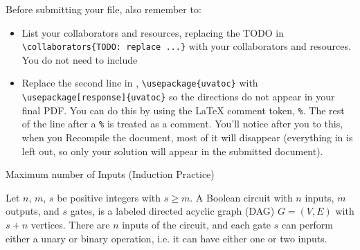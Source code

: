 \documentclass[11pt]{article}
\begin{document}
{Before submitting your  file, also remember to:
\begin{itemize}
\item List your collaborators and resources, replacing the TODO in {\texttt{\textbackslash collaborators\{TODO: replace ...\}}} with your collaborators and resources. You do not need to include

\item Replace the second line in , \texttt{\textbackslash usepackage\{uvatoc\}} with \texttt{\textbackslash usepackage[response]\{uvatoc\}} so the directions do not appear in your final PDF. You can do this by using the LaTeX comment token, {\texttt{\%}}. The rest of the line after a {\texttt{\%}} is treated as a comment. You'll notice after you to this, when you Recompile the document, most of it will disappear (everything in  is left out, so only your solution will appear in the submitted document).
\end{itemize}
}


\begin{problem}
Maximum number of Inputs (Induction Practice)
\end{problem}


\begin{definition}

Let $n$, $m$, $s$ be positive integers with $s \geq m$. A Boolean circuit with $n$ inputs, $m$ outputs, and $s$ gates, is a labeled directed acyclic graph (DAG) $G=(V,E)$ with $s+n$ vertices. There are $n$ inputs of the circuit, and each gate $s$ can perform either a unary or binary operation, i.e. it can have either one or two inputs.

\end{definition}


\newtheorem{theorem}{Theorem}
\end{document}
